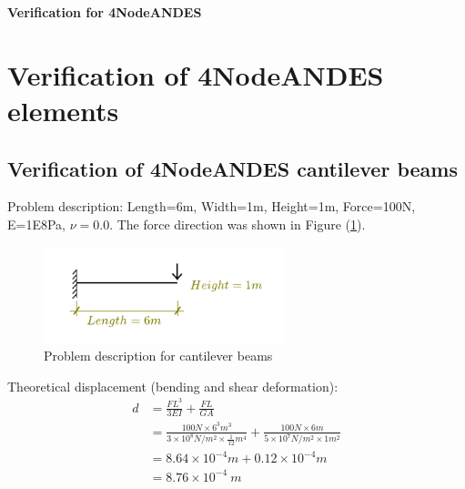 \documentclass[fleqn,11pt,letter]{article}
\begin{document}



















\newpage
\begin{center}
  \Large\textbf{Verification for 4NodeANDES}
\end{center}


\vskip 24pt

\section{Verification of 4NodeANDES elements}
\subsection{Verification of 4NodeANDES cantilever beams}





Problem description: Length=6m, Width=1m, Height=1m, Force=100N, E=1E8Pa, $\nu=0.0$. The force direction was shown in Figure (\ref{fig Problem description for cantilever 4}). 

\begin{figure}[H]
  \centering
  \includegraphics[width=7cm]{../Figure_files/4NodeANDES/cantilever_6.pdf}
  \caption{Problem description for cantilever beams}
  \label{fig Problem description for cantilever 4}
\end{figure}


Theoretical displacement (bending and shear deformation):
\begin{equation}
  \begin{aligned}
  d &=\frac{FL^3}{3EI}+\frac{FL}{GA} \\ 
    &= \frac{100 N \times 6^3 m^3}{3\times 10^8 N/m^2 \times \frac{1}{12} m^4}+ 
    \frac{100 N\times 6 m}{5\times 10^7 N/m^2\times 1 m^2} \\ 
    &=8.64\times 10^{-4} m + 0.12 \times 10^{-4} m  \\
   & =8.76\times 10^{-4} \ m
   \end{aligned}
\end{equation}
\end{document}
